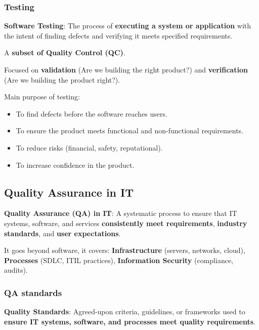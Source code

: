 \subsubsection{Testing}

\indent 

\textbf{Software Testing}: The process of \textbf{executing a system or application} with the intent of finding defects and verifying it meets specified requirements.

A \textbf{subset of Quality Control (QC)}.

Focused on \textbf{validation} (Are we building the right product?) and \textbf{verification} (Are we building the product right?).

\bigskip

Main purpose of testing:

\begin{itemize}
    \item To find defects before the software reaches users.
    \item To ensure the product meets functional and non-functional requirements.
    \item To reduce risks (financial, safety, reputational).
    \item To increase confidence in the product.
\end{itemize}

\subsection{Quality Assurance in IT}

\indent 

\noindent\textbf{Quality Assurance (QA) in IT}: A systematic process to ensure that IT systems, software, and services \textbf{consistently meet requirements}, \textbf{industry standards}, and \textbf{user expectations}.

\bigskip

It goes beyond software, it covers: \textbf{Infrastructure} (servers, networks, cloud), \textbf{Processes} (SDLC, ITIL practices), \textbf{Information Security} (compliance, audits).

\subsubsection{QA standards}

\indent 

\noindent\textbf{Quality Standards}: Agreed-upon criteria, guidelines, or frameworks used to \textbf{ensure IT systems, software, and processes meet quality requirements}.

